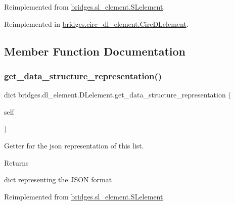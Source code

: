 Reimplemented from \mbox{\hyperlink{classbridges_1_1sl__element_1_1_s_lelement_a0824caaa305931953bf3f6d53d3a3d14}{bridges.\+sl\+\_\+element.\+S\+Lelement}}.



Reimplemented in \mbox{\hyperlink{classbridges_1_1circ__dl__element_1_1_circ_d_lelement_a6db1440877da650713f41a3450377d49}{bridges.\+circ\+\_\+dl\+\_\+element.\+Circ\+D\+Lelement}}.



\subsection{Member Function Documentation}
\mbox{\label{classbridges_1_1dl__element_1_1_d_lelement_aa64bd3f44ef45870456bf7bea80daadd}} 
\subsubsection{\texorpdfstring{get\_data\_structure\_representation()}{get\_data\_structure\_representation()}}
{\footnotesize\ttfamily  dict bridges.\+dl\+\_\+element.\+D\+Lelement.\+get\+\_\+data\+\_\+structure\+\_\+representation (\begin{DoxyParamCaption}\item[{}]{self }\end{DoxyParamCaption})}



Getter for the json representation of this list. 

\begin{DoxyReturn}{Returns}


dict representing the J\+S\+ON format 
\end{DoxyReturn}


Reimplemented from \mbox{\hyperlink{classbridges_1_1sl__element_1_1_s_lelement_adcf1fd38e95d8bbcfa64dac7262c0285}{bridges.\+sl\+\_\+element.\+S\+Lelement}}.

\mbox{\label{classbridges_1_1dl__element_1_1_d_lelement_a6ffddb5ac79a3945c1559dbc2236ab81}} 
